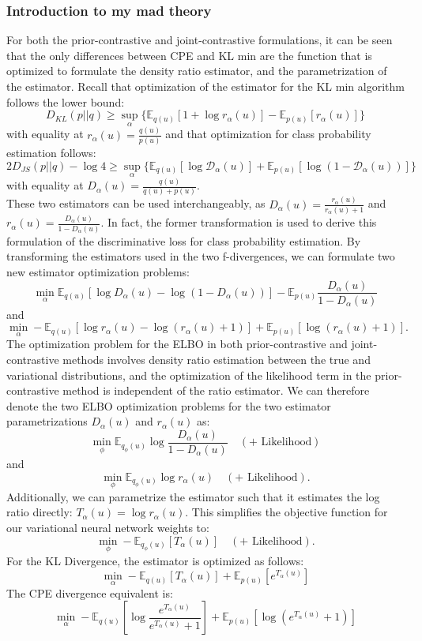 \documentclass[a4paper,12pt]{article}
\newcommand{\E}{\mathbb{E}}
\numberwithin{equation}{section}
\begin{document}
\subsubsection{Introduction to my mad theory}
For both the prior-contrastive and joint-contrastive formulations, it can be seen that the only differences between CPE and KL min are the function that is optimized to formulate the density ratio estimator, and the parametrization of the estimator. Recall that optimization of the estimator for the KL min algorithm follows the lower bound:
\[D_{KL}(p||q)\geq \sup_{\alpha}\{\mathbb{E}_{q(u)}[1+\log r_\alpha(u)]-\mathbb{E}_{p(u)}[r_\alpha(u)]\}\]
with equality at $r_\alpha(u)=\frac{q(u)}{p(u)}$ and that optimization for class probability estimation follows:
\[2D_{JS}(p||q)-\log 4\geq \sup_\alpha\{\mathbb{E}_{q(u)}[\log \mathcal{D}_\alpha(u)]+\mathbb{E}_{p(u)}[\log(1-\mathcal{D}_\alpha(u))]\}\]
with equality at $D_\alpha(u)=\frac{q(u)}{q(u)+p(u)}$.\\
These two estimators can be used interchangeably, as $D_\alpha(u)=\frac{r_\alpha(u)}{r_\alpha(u)+1}$ and $r_\alpha(u)=\frac{D_\alpha(u)}{1-D_\alpha(u)}$. In fact, the former transformation is used to derive this formulation of the discriminative loss for class probability estimation. By transforming the estimators used in the two f-divergences, we can formulate two new estimator optimization problems:
\[\min_\alpha \mathbb{E}_{q(u)}[\log D_\alpha (u)-\log(1-D_\alpha(u))]-\mathbb{E}_{p(u)}\frac{D_\alpha(u)}{1-D_\alpha(u)}\]
and
\[\min_\alpha -\mathbb{E}_{q(u)}[\log r_\alpha(u)-\log (r_\alpha(u)+1)]+\mathbb{E}_{p(u)}[\log(r_\alpha(u)+1)].\]
The optimization problem for the ELBO in both prior-contrastive and joint-contrastive methods involves density ratio estimation between the true and variational distributions, and the optimization of the likelihood term in the prior-contrastive method is independent of the ratio estimator. We can therefore denote the two ELBO optimization problems for the two estimator parametrizations $D_\alpha (u)$ and $r_\alpha(u)$ as:
\[\min_\phi \mathbb{E}_{q_\phi(u)}\log \frac{D_\alpha (u)}{1-D_\alpha (u)}\quad(+\text{ Likelihood})\]
and
\[\min_\phi \mathbb{E}_{q_\phi(u)}\log r_\alpha (u)\quad(+\text{ Likelihood}).\]
Additionally, we can parametrize the estimator such that it estimates the log ratio directly: $T_\alpha(u)=\log r_\alpha(u)$. This simplifies the objective function for our variational neural network weights to:
\[\min_\phi -\mathbb{E}_{q_\phi(u)}[T_\alpha(u)]\quad(+\text{ Likelihood}).\]
For the KL Divergence, the estimator is optimized as follows:
\[\min_\alpha -\mathbb{E}_{q(u)}[T_\alpha(u)]+\mathbb{E}_{p(u)}[e^{T_\alpha (u)}]\]
The CPE divergence equivalent is:
\[\min_\alpha -\E_{q(u)}\left[\log \frac{e^{T_\alpha(u)}}{e^{T_\alpha(u)}+1}\right]+\E_{p(u)}[\log(e^{T_\alpha(u)}+1)]\]
\end{document}
